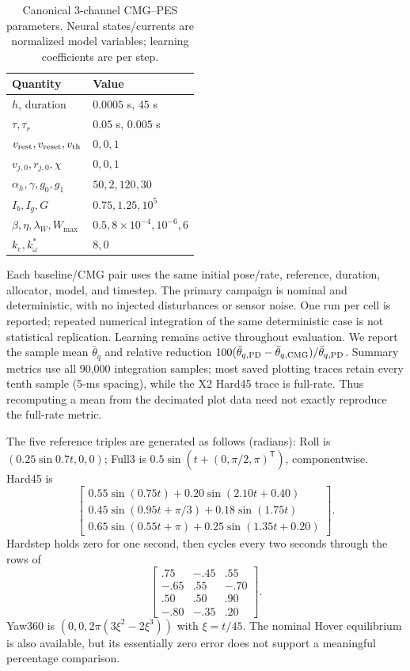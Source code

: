 \documentclass[letterpaper,10pt,conference]{IEEEtran}
\newcommand{\T}{^{\mathsf T}}
\begin{document}
\begin{table}[t]
\caption{Canonical 3-channel CMG--PES parameters. Neural states/currents
are normalized model variables; learning coefficients are per step.}
\label{tab:parameters}\centering\small
\begin{tabular}{ll}
\toprule
Quantity & Value\\\midrule
$h$, duration & $0.0005$ s, $45$ s\\
$\tau,\tau_r$ & $0.05$ s, $0.005$ s\\
$v_{\rm rest},v_{\rm reset},v_{\rm th}$ & $0,0,1$\\
$v_{j,0},r_{j,0},\chi$ & $0,0,1$\\
$\alpha_h,\gamma,g_0,g_1$ & $50,2,120,30$\\
$I_b,I_g,G$ & $0.75,1.25,10^5$\\
$\beta,\eta,\lambda_W,W_{\max}$ & $0.5,8\times10^{-4},10^{-6},6$\\
$k_e,k_\omega^*$ & $8,0$\\
\bottomrule
\end{tabular}
\end{table}

Each baseline/CMG pair uses the same initial pose/rate, reference, duration,
allocator, model, and timestep. The primary campaign is nominal and
deterministic, with no injected disturbances or sensor noise. One run per
cell is reported; repeated numerical integration of the same deterministic
case is not statistical replication. Learning remains active throughout
evaluation. We report the sample mean $\bar\theta_q$ and relative reduction
$100(\bar\theta_{q,\rm PD}-\bar\theta_{q,\rm CMG})/\bar\theta_{q,\rm PD}$.
Summary metrics use all 90,000 integration samples; most saved plotting
traces retain every tenth sample (5-ms spacing), while the X2 Hard45
trace is full-rate. Thus recomputing a mean from
the decimated plot data need not exactly reproduce the full-rate metric.

The five reference triples are generated as follows (radians):
Roll is $(0.25\sin0.7t,0,0)$; Full3 is
$0.5\sin(t+(0,\pi/2,\pi)\T)$, componentwise. Hard45 is
\begin{equation}
 \begin{bmatrix}
 0.55\sin(0.75t)+0.20\sin(2.10t+0.40)\\
 0.45\sin(0.95t+\pi/3)+0.18\sin(1.75t)\\
 0.65\sin(0.55t+\pi)+0.25\sin(1.35t+0.20)
 \end{bmatrix}.
\end{equation}
Hardstep holds zero for one second, then cycles every two seconds through
the rows of
\begin{equation}
 \begin{bmatrix}
 .75&-.45&.55\\-.65&.55&-.70\\.50&.50&.90\\-.80&-.35&.20
 \end{bmatrix}.
\end{equation}
Yaw360 is $(0,0,2\pi(3\xi^2-2\xi^3))$ with $\xi=t/45$.
The nominal Hover equilibrium is also available, but its essentially zero
error does not support a meaningful percentage comparison.
\end{document}
